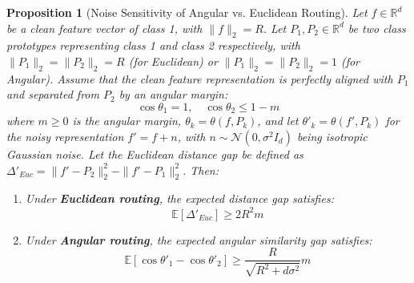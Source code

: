 \documentclass{article}
\theoremstyle{plain}
\newtheorem{proposition}[theorem]{Proposition}
\theoremstyle{definition}
\theoremstyle{remark}
\begin{document}
\begin{proposition}[Noise Sensitivity of Angular vs. Euclidean Routing]
Let $f \in \mathbb{R}^d$ be a clean feature vector of class 1, with $\|f\|_2 = R$. Let $P_1, P_2 \in \mathbb{R}^d$ be two class prototypes representing class 1 and class 2 respectively, with $\|P_1\|_2 = \|P_2\|_2 = R$ (for Euclidean) or $\|P_1\|_2 = \|P_2\|_2 = 1$ (for Angular). Assume that the clean feature representation is perfectly aligned with $P_1$ and separated from $P_2$ by an angular margin:
\begin{equation}
\cos \theta_1 = 1, \quad \cos \theta_2 \le 1 - m
\end{equation}
where $m \ge 0$ is the angular margin, $\theta_k = \theta(f, P_k)$, and let $\theta'_k = \theta(f', P_k)$ for the noisy representation $f' = f + n$, with $n \sim \mathcal{N}(0, \sigma^2 I_d)$ being isotropic Gaussian noise. Let the Euclidean distance gap be defined as $\Delta'_{Euc} = \|f' - P_2\|_2^2 - \|f' - P_1\|_2^2$. Then:
\begin{enumerate}
    \item Under \textbf{Euclidean routing}, the expected distance gap satisfies:
    \begin{equation}
    \mathbb{E}[\Delta'_{Euc}] \ge 2 R^2 m
    \end{equation}
    \item Under \textbf{Angular routing}, the expected angular similarity gap satisfies:
    \begin{equation}
    \mathbb{E}[\cos \theta'_1 - \cos \theta'_2] \ge \frac{R}{\sqrt{R^2 + d \sigma^2}} m
    \end{equation}
\end{enumerate}
\end{proposition}
\end{document}
